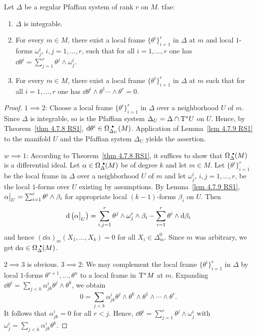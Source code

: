\begin{thm}\label{prop 4.7.10 RS1}
    Let $\Delta$ be a regular Pfaffian system of rank $r$ on $M$. \gls{tfae}:
    \begin{enumerate}
        \item $\Delta$ is integrable.
        \item For every $m\in M$, there exist a local frame $\{\theta^i\}_{i=1}^r$ in $\Delta$ at $m$ and local $1$-forms $\omega_j^i$, $i,j=1,\ldots,r$, such that for all $i=1,\ldots,r$ one has $\dd\theta^i=\sum_{j=1}^r \theta^j\wedge \omega_j^i$.
        \item For every $m\in M$, there exist a local frame $\{\theta^i\}_{i=1}^r$ in $\Delta$ at $m$ such that for all $i=1,\ldots,r$ one has $\dd\theta^i\wedge \theta^1\cdots\wedge\theta^r=0$.
    \end{enumerate}
\end{thm}
\begin{proof}
    $1\implies2$: Choose a local frame $\{\theta^i\}_{i=1}^r$ in $\Delta$ over a neighborhood $U$ of $m$. Since $\Delta$ is integrable, so is the Pfaffian system $\Delta_U=\Delta\cap \mathrm{T}^\ast U$ on $U$. Hence, by Theorem~\ref{thm 4.7.8 RS1}, $\dd\theta^i\in\Omega^{\smbullet }_{\Delta_U}(M)$. Application of Lemma~\ref{lem 4.7.9 RS1} to the manifold $U$ and the Pfaffian system $\Delta_U$ yields the assertion.

    $w\implies1$: According to Theorem~\ref{thm 4.7.8 RS1}, it suffices to show that $\Omega^{\smbullet }_\Delta(M)$ is a differential ideal. Let $\alpha\in\Omega^{\smbullet }_\Delta(M)$ be of degree $k$ and let $m\in M$. Let $\{\theta^i\}_{i=1}^r$ be the local frame in $\Delta$ over a neighborhood $U$ of $m$ and let $\omega^i_j$, $i,j=1,\ldots,r$, be the local $1$-forms over $U$ existing by assumptions. By Lemma~\ref{lem 4.7.9 RS1}, $\restr{\alpha}{U}=\sum_{i=1}^r\theta^i\wedge\beta_i$ for appropriate local $(k-1)$-forms $\beta_i$ on $U$. Then
    \[\dd\left(\restr{\alpha}{U}\right)=\sum_{i,j=1}^r\theta^j\wedge\omega_j^i\wedge \beta_i-\sum_{i=1}^r \theta^i\wedge\dd \beta_i\]
    and hence $(\dd\alpha)_m(X_1,\ldots,X_k)=0$ for all $X_i\in\Delta_m^0$. Since $m$ was arbitrary, we get $\dd\alpha\in\Omega^{\smbullet }_\Delta(M)$.

    $2\implies3$ is obvious. $3\implies2$: We may complement the local frame $\{\theta^i\}_{i=1}^r$ in $\Delta$ by local $1$-forms $\theta^{r+1},\ldots,\theta^n$ to a local frame in $\mathrm{T}^\ast M$ at $m$. Expanding $\dd\theta^i=\sum_{j<k}\alpha^i_{jk}\theta^j\wedge\theta^k$, we obtain
    \[0=\sum_{j<k}\alpha^i_{jk}\theta^j\wedge\theta^k\wedge\theta^1\wedge\cdots\wedge\theta^r.\]
    It follows that $\alpha^i_{jk}=0$ for all $r<j$. Hence, $\dd\theta^i=\sum_{j=1}^r\theta^j\wedge\omega_j^i$ with $\omega^i_j=\sum_{j<k}\alpha^i_{jk}\theta^k$.
\end{proof}


